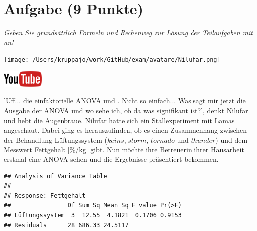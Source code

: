 \documentclass[a4paper, 9pt]{scrartcl}\usepackage[]{graphicx}\usepackage[]{xcolor}
\makeatletter
\newenvironment{kframe}{%
 \def\at@end@of@kframe{}%
 \ifinner\ifhmode%
  \def\at@end@of@kframe{\end{minipage}}%
  \begin{minipage}{\columnwidth}%
 \fi\fi%
 \def\FrameCommand##1{\hskip\@totalleftmargin \hskip-\fboxsep
 \colorbox{shadecolor}{##1}\hskip-\fboxsep
     \hskip-\linewidth \hskip-\@totalleftmargin \hskip\columnwidth}%
 \MakeFramed {\advance\hsize-\width
   \@totalleftmargin\z@ \linewidth\hsize
   \@setminipage}}%
 {\par\unskip\endMakeFramed%
 \at@end@of@kframe}
\newenvironment{knitrout}{}{} %
\makeatother
\begin{document}
 
\clearpage

\section{Aufgabe \hfill (9 Punkte)}

\textit{Geben Sie grundsätzlich Formeln und Rechenweg zur Lösung der Teilaufgaben mit an!} \\[1Ex]
 

 
\begin{minipage}[t]{0.5\textwidth}
\texttt{[image: /Users/kruppajo/work/GitHub/exam/avatare/Nilufar.png]}
\end{minipage}
\begin{minipage}[t]{0.5\textwidth}
\hfill
\href{https://youtu.be/aXvxGC4YLqk}{\includegraphics[width = 2cm]{img/youtube}}\\[1Ex]
\end{minipage}
\vspace{1ex}



'Uff... die einfaktorielle ANOVA und \Rlogo. Nicht so einfach... Was sagt mir jetzt die Ausgabe der ANOVA und wo sehe ich, ob da was signifikant ist?', denkt Nilufar und hebt die Augenbraue. Nilufar hatte sich ein Stallexperiment mit Lamas angeschaut. Dabei ging es herauszufinden, ob es einen Zusammenhang zwischen der Behandlung Lüftungssystem ($keins$, $storm$, $tornado$ und $thunder$) und dem Messwert Fettgehalt [\%/kg] gibt. Nun möchte ihre Betreuerin ihrer Hausarbeit erstmal eine ANOVA sehen und die Ergebnisse präsentiert bekommen.

\begin{knitrout}
\color{fgcolor}\begin{kframe}
\begin{verbatim}
## Analysis of Variance Table
## 
## Response: Fettgehalt
##                Df Sum Sq Mean Sq F value Pr(>F)
## Lüftungssystem  3  12.55  4.1821  0.1706 0.9153
## Residuals      28 686.33 24.5117
\end{verbatim}
\end{kframe}
\end{knitrout}
\end{document}
